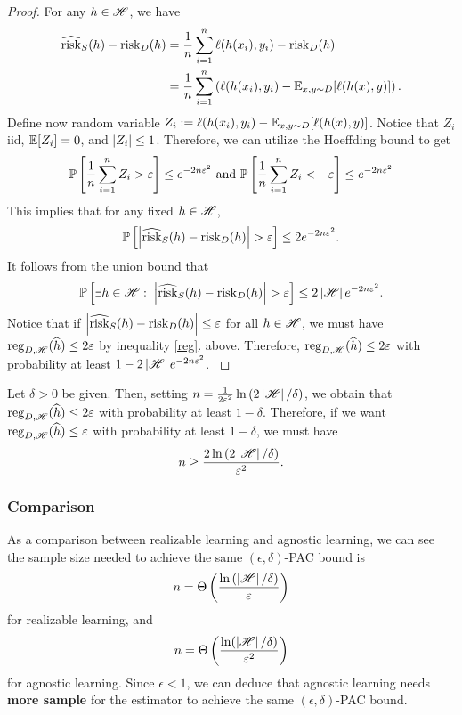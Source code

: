 \documentclass[a4paper]{article}
\begin{document}
\begin{proof}
{  For any $h \in \mathscr{H}$, we have
  \[
  \begin{aligned}
    \widehat{\operatorname{risk}}_S (h) - \operatorname{risk}_D(h) 
    &= \frac{1}{n} \sum_{i=1}^n \ell(h(x_i), y_i) 
    - \operatorname{risk}_D (h) \\
    &= \frac{1}{n} \sum_{i=1}^n \left( 
      \ell(h(x_i), y_i) - \mathbb{E}_{x, y \sim D} 
      [\ell(h(x), y)]
     \right).
  \end{aligned}
  \]
  Define now random variable $Z_i := \ell(h(x_i), y_i) - 
  \mathbb{E}_{x, y \sim D} [\ell(h(x), y)]$. Notice that $Z_i$ 
  iid, $\mathbb{E}[Z_i] = 0$, and $\left\lvert Z_i\right\rvert \leq 1$. Therefore, 
  we can utilize the Hoeffding bound to get 
  \[
  \mathbb{P} \left[ \frac{1}{n} \sum_{i=1}^n Z_i > \varepsilon \right]
  \leq e^{- 2 n \varepsilon^2} \text{ and }
  \mathbb{P} \left[ \frac{1}{n} \sum_{i=1}^n Z_i < -\varepsilon \right]
  \leq e^{- 2 n \varepsilon^2}
  \]
  This implies that for any fixed $h \in \mathscr{H}$,  
  \[
  \mathbb{P} \left[ \left\lvert \widehat{\operatorname{risk}}_S(h) - \operatorname{risk}_D(h)\right\rvert > \varepsilon 
  \right] \leq 2 e^{-2 n \varepsilon^2}.
  \]
  It follows from the union bound that 
  \[
  \mathbb{P} \left[ \exists h \in \mathscr{H}: \; 
  \left\lvert \widehat{\operatorname{risk}}_S(h) - \operatorname{risk}_D(h)\right\rvert > \varepsilon \right] 
  \leq 2 \left\lvert \mathscr{H}\right\rvert e^{- 2 n \varepsilon^2}.
  \]
  Notice that if  
  $\left\lvert \widehat{\operatorname{risk}}_S (h) - \operatorname{risk}_D (h)\right\rvert \leq \varepsilon$
  for all $h \in \mathscr{H}$, we must have $\operatorname{reg}_{D, \mathscr{H}} 
  (\widehat{h}) \leq 2 \varepsilon$ by inequality \eqref{reg}.
  above. Therefore,
  $\operatorname{reg}_{D, \mathscr{H}} (\widehat{h}) \leq 2 \varepsilon$ with probability at least 
  $1 - 2 \left\lvert \mathscr{H}\right\rvert e^{- 2 n \varepsilon^2}$. 
}
\end{proof}

\begin{cor}
Let $\delta > 0$ be given. Then, 
setting 
$n = \frac{1}{2\varepsilon^2} \ln \left( 2 \left\lvert \mathscr{H}\right\rvert / 
\delta \right)$, we obtain that $\operatorname{reg}_{D, \mathscr{H}} (\widehat{h})
\leq 2\varepsilon$ with probability at least $1 - \delta$.
Therefore, if we want $\operatorname{reg}_{D, \mathscr{H}} 
(\widehat{h}) \leq \varepsilon$ with probability at least $1 - 
\delta$, we must have 
\[
  n \geq \frac{2 \ln 
  \left( 2 \left\lvert \mathscr{H}\right\rvert / \delta \right)}
  {\varepsilon^2}.
\]
\end{cor}

\subsubsection*{Comparison}

As a comparison between realizable learning and agnostic 
learning, we can see the sample size needed to 
achieve the same $(\epsilon, \delta)$-PAC bound is 
\[
n = \Theta \left( \frac{\ln \left( \left\lvert \mathscr{H}\right\rvert / \delta
\right)}{\varepsilon} \right)
\]
for realizable learning, and 
\[
n = \Theta \left( \frac{\ln(\left\lvert \mathscr{H}\right\rvert / \delta)}{\varepsilon^2} 
\right)
\]
for agnostic learning. Since $\epsilon < 1$, 
we can deduce that agnostic learning needs 
\textbf{more sample} for the estimator to achieve the 
same $(\epsilon, \delta)$-PAC bound.
\end{document}

